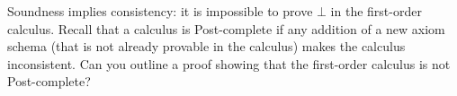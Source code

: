 \begin{exercise}
  Soundness implies consistency:
  it is impossible to prove $\bot$ in the first-order calculus.
  Recall that a calculus is Post-complete if
  any addition of a new axiom schema
  (that is not already provable in the calculus)
  makes the calculus inconsistent.
  Can you outline a proof showing that the first-order calculus is not Post-complete?
\end{exercise}


